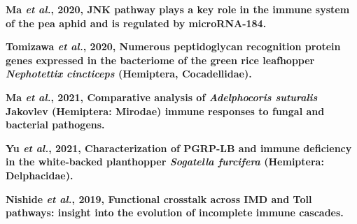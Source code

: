 \documentclass[11pt]{article}
\begin{document}
\begin{sloppypar}
\par
\textbf{Ma \textit{et al.}, 2020, JNK pathway plays a key role in the immune system of the pea aphid and is regulated by microRNA-184.} \newline
\par
\textbf{Tomizawa \textit{et al.}, 2020, Numerous peptidoglycan recognition protein genes expressed in the bacteriome of the green rice leafhopper \textit{Nephotettix cincticeps} (Hemiptera, Cocadellidae).} \newline
\par
\textbf{Ma \textit{et al.}, 2021, Comparative analysis of \textit{Adelphocoris suturalis} Jakovlev (Hemiptera: Mirodae) immune responses to fungal and bacterial pathogens.} \newline
\par
\textbf{Yu \textit{et al.}, 2021, Characterization of PGRP-LB and immune deficiency in the white-backed planthopper \textit{Sogatella furcifera} (Hemiptera: Delphacidae).} \newline
\par
\textbf{Nishide \textit{et al.}, 2019, Functional crosstalk across IMD and Toll pathways: insight into the evolution of incomplete immune cascades.}
\end{sloppypar}
\end{document}
